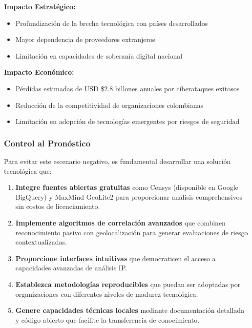 \textbf{Impacto Estratégico:}
\begin{itemize}
    \item Profundización de la brecha tecnológica con países desarrollados
    \item Mayor dependencia de proveedores extranjeros
    \item Limitación en capacidades de soberanía digital nacional
\end{itemize}

\textbf{Impacto Económico:}
\begin{itemize}
    \item Pérdidas estimadas de USD \$2.8 billones anuales por ciberataques exitosos
    \item Reducción de la competitividad de organizaciones colombianas
    \item Limitación en adopción de tecnologías emergentes por riesgos de seguridad
\end{itemize}

\subsubsection{Control al Pronóstico}
Para evitar este escenario negativo, es fundamental desarrollar una solución tecnológica que:

\begin{enumerate}
    \item \textbf{Integre fuentes abiertas gratuitas} como Censys (disponible en Google BigQuery) y MaxMind GeoLite2 para proporcionar análisis comprehensivos sin costos de licenciamiento.
    \item \textbf{Implemente algoritmos de correlación avanzados} que combinen reconocimiento pasivo con geolocalización para generar evaluaciones de riesgo contextualizadas.
    \item \textbf{Proporcione interfaces intuitivas} que democraticen el acceso a capacidades avanzadas de análisis IP.
    \item \textbf{Establezca metodologías reproducibles} que puedan ser adoptadas por organizaciones con diferentes niveles de madurez tecnológica.
    \item \textbf{Genere capacidades técnicas locales} mediante documentación detallada y código abierto que facilite la transferencia de conocimiento.
\end{enumerate}